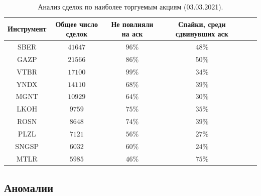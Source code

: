 \begin{table}[h!]
    \begin{center}
        \begin{tabular}{|c|c|c|c|c|c|}
            \hline
        Инструмент   & Общее число сделок & Не повлияли на аск & Спайки, среди сдвинувших аск \\ \hline
        SBER &  $41647$  & $ 96\% $ &  $ 48\% $\\ \hline
        GAZP &  $21566$  & $ 86\% $  & $ 50\% $ \\ \hline
        VTBR &  $17100$  & $ 99\% $ &  $ 34\%$ \\ \hline
        YNDX &  $14110$  & $ 68\% $  & $ 39\% $ \\ \hline
        MGNT &  $10929$  & $ 64\% $  & $ 30\% $ \\ \hline
        LKOH &  $9759 $ &  $ 75\% $ &  $ 35\% $\\ \hline
        ROSN &  $8648 $ &  $ 74\% $ &  $ 39\%$ \\ \hline
        PLZL &  $7121 $ &  $ 56\% $ &  $ 27\% $\\ \hline
        SNGSP & $ 6032$  & $ 60\% $  & $ 24\% $ \\ \hline
        MTLR &  $5985 $ &  $ 46\% $ &  $ 75\%$\\ \hline
        \end{tabular}
    \end{center}
    \label{tableanalSE}
    \caption{Анализ сделок по наиболее торгуемым акциям (03.03.2021).}
\end{table} 




\subsection{Аномалии}


